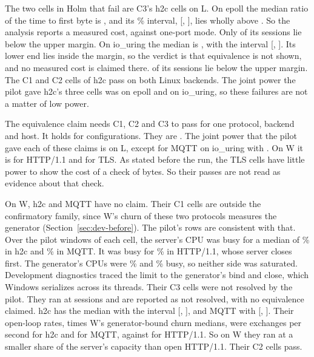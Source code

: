 The two cells in Holm that fail are C3's h2c cells on L. On epoll the median ratio of the time to
first byte is \CThreeLEpollHTwoCMedian, and its \CiPct\% interval,
[\CThreeLEpollHTwoCLow, \CThreeLEpollHTwoCHigh], lies wholly above \MarginHigh. So the analysis
reports a measured cost, against one-port mode. Only \CThreeLEpollHTwoCSignXHigh{} of its
\CThreeLEpollHTwoCValid{} sessions lie below the upper margin. On io\_uring the median is
\CThreeLIouringHTwoCMedian, with the interval [\CThreeLIouringHTwoCLow, \CThreeLIouringHTwoCHigh].
Its lower end lies inside the margin, so the verdict is that equivalence is not shown, and no
measured cost is claimed there. \CThreeLIouringHTwoCSignXHigh{} of its \CThreeLIouringHTwoCValid{}
sessions lie below the upper margin. The C1 and C2 cells of h2c pass on both Linux backends. The
joint power the pilot gave h2c's three cells was \JointPowerLEpollHtwoc{} on epoll and
\JointPowerLIouringHtwoc{} on io\_uring, so these failures are not a matter of low power.

The equivalence claim needs C1, C2 and C3 to pass for one protocol, backend and host. It
holds for \CostClaimCount{} configurations. They are \CostClaims. The joint power that the pilot
gave each of these claims is \LEpollHttpJointPower{} on L, except for MQTT on io\_uring with
\LIouringMqttJointPower. On W it is \WIocpHttpJointPower{} for HTTP/1.1 and \WIocpTlsJointPower{}
for TLS. As stated before the run, the TLS cells have little power to show the cost of a check of
\TlsNeed{} bytes. So their passes are not read as evidence about that check.

On W, h2c and MQTT have no claim. Their C1 cells are outside the confirmatory family, since W's
churn of these two protocols measures the generator (Section~\ref{sec:dev-before}). The pilot's
rows are consistent with that. Over the \PilotWWindows{} pilot windows of each cell, the server's CPU was busy for a
median of \PilotWHtwocServerBusy\% in h2c and \PilotWMqttServerBusy\% in MQTT. It was busy for
\PilotWHttpServerBusy\% in HTTP/1.1, whose server closes first. The generator's CPUs were
\PilotWHtwocGenCpusBusy\% and \PilotWMqttGenCpusBusy\% busy, so neither side was saturated.
Development diagnostics traced the limit to the generator's bind and close, which Windows
serializes across its threads. Their C3 cells were not resolved by the pilot. They ran at \RC{} sessions and are reported as not resolved, with no
equivalence claimed. h2c has the median \CThreeWIocpHTwoCMedian{} with the interval
[\CThreeWIocpHTwoCLow, \CThreeWIocpHTwoCHigh], and MQTT \CThreeWIocpMqttMedian{} with
[\CThreeWIocpMqttLow, \CThreeWIocpMqttHigh]. Their open-loop rates, \RateFrac{} times W's
generator-bound churn medians, were \LambdaWHtwoc{} exchanges per second for h2c and
\LambdaWMqtt{} for MQTT, against \LambdaWHttp{} for HTTP/1.1. So on W they ran at a smaller share of the server's capacity than open
HTTP/1.1. Their C2 cells pass.

